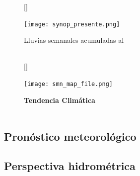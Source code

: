 \documentclass[11pt,spanish,a4paper] {article}
\DeclareRobustCommand{\fecha}{}
\DeclareRobustCommand{\fechaformat}{}
\DeclareRobustCommand{\textomapasemanal}{}
\DeclareRobustCommand{\tendenciaclimatica}{}
\DeclareRobustCommand{\pronosticometeorologico}{}
\DeclareRobustCommand{\perspectivahidrometrica}{}
\DeclareRobustCommand{\pronosemanal}{}
\begin{document}
\begin{figure}[H]
	[\FBwidth]
	{\caption{Lluvias semanales acumuladas al \fechaformat\\\hspace{\textwidth}\\\hspace{\textwidth}\textomapasemanal}\label{synopmap}}
	{\texttt{[image: synop\_presente.png]}}
\end{figure}

\begin{figure}[H]
	[\FBwidth]
	{\caption{\large{\textbf{Tendencia Climática}}\\\hspace{\textwidth}\\\hspace{\textwidth}\tendenciaclimatica}\label{smnmap}}
	{\texttt{[image: smn\_map\_file.png]}}
\end{figure}
\subsection*{Pronóstico meteorológico}
\pronosticometeorologico
\subsection*{Perspectiva hidrométrica}
\perspectivahidrometrica

\noindent
{\small
\pronosemanal
}
\end{document}
